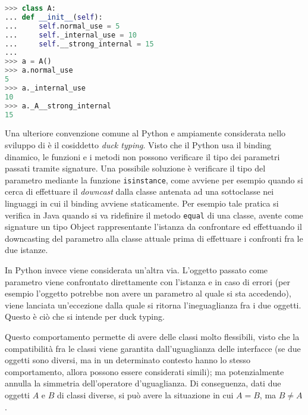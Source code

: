 \captionsetup{justification=centering}
\begin{lstlisting}[language=Python, frame=topline, caption=Convenzioni per l'uso interno.]
>>> class A:
...	def __init__(self):
...		self.normal_use = 5
...		self._internal_use = 10
...		self.__strong_internal = 15
...
>>> a = A()
>>> a.normal_use
5
>>> a._internal_use
10
>>> a._A__strong_internal
15
\end{lstlisting}
\captionsetup{justification=justified}

Una ulteriore convenzione comune al Python e ampiamente considerata
nello sviluppo di \pygfa è il cosiddetto \emph{duck typing}.
Visto che il Python usa il binding dinamico, le funzioni e i metodi non
possono verificare il tipo dei parametri passati tramite signature.
Una possibile soluzione è verificare il tipo del parametro mediante
la funzione \texttt{isinstance}, come avviene per esempio quando
si cerca di effettuare il \emph{downcast} dalla classe antenata
ad una sottoclasse nei linguaggi in cui il binding avviene staticamente.
Per esempio tale pratica si verifica in Java quando si va ridefinire il metodo
\texttt{equal} di una classe, avente come signature un tipo Object rappresentante
l'istanza da confrontare ed effettuando il downcasting del parametro alla classe
attuale prima di effettuare i confronti fra le due istanze.

In Python invece viene considerata un'altra via. L'oggetto passato come
parametro viene confrontato direttamente con l'istanza e in caso
di errori (per esempio l'oggetto potrebbe non avere un parametro al quale
si sta accedendo), viene lanciata un'eccezione dalla quale si ritorna l'ineguaglianza
fra i due oggetti. Questo è ciò che si intende per duck typing.

Questo comportamento permette di avere delle classi molto flessibili,
visto che la compatibilità fra le classi viene garantita dall'uguaglianza
delle interfacce (se due oggetti sono diversi, ma in un determinato
contesto hanno lo stesso comportamento, allora possono essere considerati
simili); ma potenzialmente annulla la simmetria dell'operatore d'uguaglianza.
Di conseguenza, dati due oggetti $A$ e $B$ di classi diverse, si può
avere la situazione in cui $A = B$, ma $B \neq A$.

